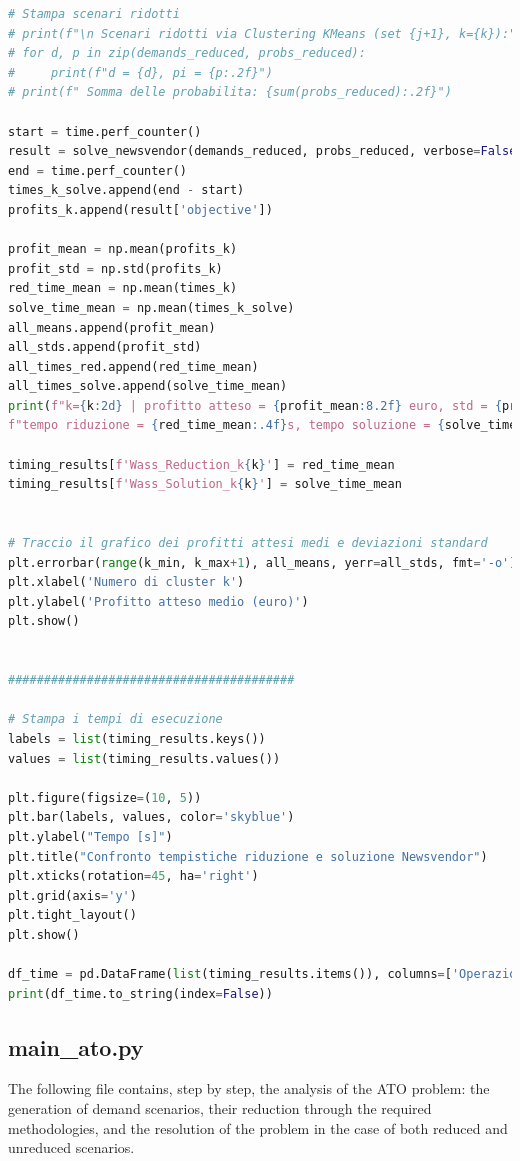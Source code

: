 \documentclass[a4paper,12pt]{article}
\begin{document}
\begin{lstlisting}[language=python,caption={Main of Newvendor problem},label={lst:main-nv}]
# Stampa scenari ridotti 
# print(f"\n Scenari ridotti via Clustering KMeans (set {j+1}, k={k}):")
# for d, p in zip(demands_reduced, probs_reduced):
#     print(f"d = {d}, pi = {p:.2f}")
# print(f" Somma delle probabilita: {sum(probs_reduced):.2f}")

start = time.perf_counter()
result = solve_newsvendor(demands_reduced, probs_reduced, verbose=False)
end = time.perf_counter()
times_k_solve.append(end - start)
profits_k.append(result['objective'])

profit_mean = np.mean(profits_k)
profit_std = np.std(profits_k)    
red_time_mean = np.mean(times_k)
solve_time_mean = np.mean(times_k_solve)
all_means.append(profit_mean)
all_stds.append(profit_std)
all_times_red.append(red_time_mean)
all_times_solve.append(solve_time_mean)
print(f"k={k:2d} | profitto atteso = {profit_mean:8.2f} euro, std = {profit_std:6.2f}euro, "
f"tempo riduzione = {red_time_mean:.4f}s, tempo soluzione = {solve_time_mean:.4f}s")

timing_results[f'Wass_Reduction_k{k}'] = red_time_mean
timing_results[f'Wass_Solution_k{k}'] = solve_time_mean


# Traccio il grafico dei profitti attesi medi e deviazioni standard
plt.errorbar(range(k_min, k_max+1), all_means, yerr=all_stds, fmt='-o')
plt.xlabel('Numero di cluster k')
plt.ylabel('Profitto atteso medio (euro)')
plt.show()


########################################

# Stampa i tempi di esecuzione
labels = list(timing_results.keys())
values = list(timing_results.values())

plt.figure(figsize=(10, 5))
plt.bar(labels, values, color='skyblue')
plt.ylabel("Tempo [s]")
plt.title("Confronto tempistiche riduzione e soluzione Newsvendor")
plt.xticks(rotation=45, ha='right')
plt.grid(axis='y')
plt.tight_layout()
plt.show()

df_time = pd.DataFrame(list(timing_results.items()), columns=['Operazione', 'Tempo [s]'])
print(df_time.to_string(index=False))

\end{lstlisting}

\subsection{main\_ato.py}
The following file contains, step by step, the analysis of the ATO problem: the generation of demand scenarios, their reduction through the required methodologies, and the resolution of the problem in the case of both reduced and unreduced scenarios.
\end{document}
